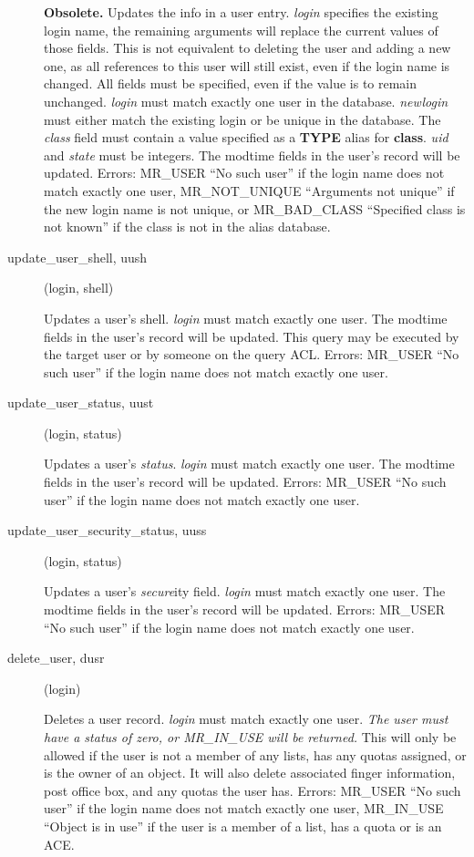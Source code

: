 \documentclass{article}
\begin{document}
\begin{description}
{\bf Obsolete.}  Updates the info in a user entry.  {\em login} specifies
the existing login name, the remaining arguments will replace the
current values of those fields.  This is not equivalent to deleting
the user and adding a new one, as all references to this user will
still exist, even if the login name is changed.  All fields must be
specified, even if the value is to remain unchanged.  {\em login} must
match exactly one user in the database.  {\em newlogin} must either
match the existing login or be unique in the database.  The {\em class}
field must contain a value specified as a {\bf TYPE} alias for
{\bf class}.  {\em uid} and {\em state} must be integers.  The modtime
fields in the user's record will be updated.  Errors: MR\_USER ``No such
user'' if the login name does not match exactly one user, MR\_NOT\_UNIQUE
``Arguments not unique'' if the new login name is not unique, or
MR\_BAD\_CLASS ``Specified class is not known'' if the class is not in the
alias database.

\item[update\_user\_shell, uush](login, shell)

Updates a user's shell.  {\em login} must match exactly one user.  The
modtime fields in the user's record will be updated.  This query may
be executed by the target user or by someone on the query ACL.
Errors: MR\_USER ``No such user'' if the login name does not match
exactly one user.

\item[update\_user\_status, uust](login, status)

Updates a user's {\em status}.  {\em login} must match exactly one user.
The modtime fields in the user's record will be updated.  Errors:
MR\_USER ``No such user'' if the login name does not match exactly one
user.

\item[update\_user\_security\_status, uuss](login, status)

Updates a user's {\em secure}ity field.  {\em login} must match exactly
one user.  The modtime fields in the user's record will be updated.
Errors: MR\_USER ``No such user'' if the login name does not match
exactly one user.

\item[delete\_user, dusr](login)

Deletes a user record. {\em login} must match exactly one user. {\em
The user must have a status of zero, or MR\_IN\_USE will be returned.}
This will only be allowed if the user is not a member of any lists,
has any quotas assigned, or is the owner of an object. It will also
delete associated finger information, post office box, and any quotas
the user has. Errors: MR\_USER ``No such user'' if the login name does
not match exactly one user, MR\_IN\_USE ``Object is in use'' if the user
is a member of a list, has a quota or is an ACE.


\end{description}
\end{document}
